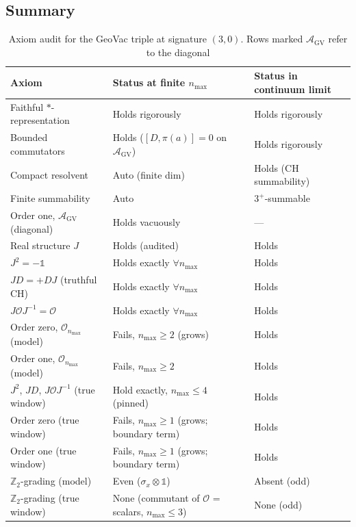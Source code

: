 \documentclass[11pt]{article}
\begin{document}
\subsection{Summary}

\begin{table}[h]
\centering
\begin{tabular}{lll}
\toprule
Axiom & Status at finite $n_{\max}$ & Status in continuum limit \\
\midrule
Faithful $*$-representation  & Holds rigorously & Holds rigorously \\
Bounded commutators           & Holds ($[D,\pi(a)] = 0$ on $\mathcal{A}_{\mathrm{GV}}$) & Holds rigorously \\
Compact resolvent             & Auto (finite dim) & Holds (CH summability) \\
Finite summability            & Auto              & $3^+$-summable \\
Order one, $\mathcal{A}_{\mathrm{GV}}$ (diagonal) & Holds vacuously & --- \\
Real structure $J$            & Holds (audited) & Holds \\
$J^2 = -\mathbb{1}$           & Holds exactly $\forall n_{\max}$ & Holds \\
$JD = +DJ$ (truthful CH)      & Holds exactly $\forall n_{\max}$ & Holds \\
$J \mathcal{O} J^{-1} = \mathcal{O}$  & Holds exactly $\forall n_{\max}$ & Holds \\
Order zero, $\mathcal{O}_{n_{\max}}$ (model) & Fails, $n_{\max}\ge 2$ (grows) & Holds \\
Order one, $\mathcal{O}_{n_{\max}}$ (model)  & Fails, $n_{\max}\ge 2$ & Holds \\
$J^2$, $JD$, $J\mathcal{O}J^{-1}$ (true window) & Hold exactly, $n_{\max} \le 4$ (pinned) & Holds \\
Order zero (true window) & Fails, $n_{\max}\ge 1$ (grows; boundary term) & Holds \\
Order one (true window)  & Fails, $n_{\max}\ge 1$ (grows; boundary term) & Holds \\
$\mathbb{Z}_2$-grading (model) & Even ($\sigma_x \otimes \mathbb{1}$) & Absent (odd) \\
$\mathbb{Z}_2$-grading (true window) & None (commutant of $\mathcal{O}$ = scalars, $n_{\max} \le 3$) & None (odd) \\
\bottomrule
\end{tabular}
\caption{Axiom audit for the GeoVac triple at signature $(3, 0)$.
Rows marked $\mathcal{A}_{\mathrm{GV}}$ refer to the diagonal
}
\end{table}
\end{document}
